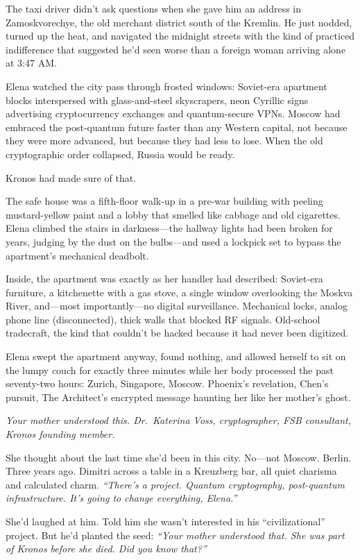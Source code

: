 \documentclass[12pt,letterpaper]{book}
\begin{document}
The taxi driver didn't ask questions when she gave him an address in Zamoskvorechye, the old merchant district south of the Kremlin. He just nodded, turned up the heat, and navigated the midnight streets with the kind of practiced indifference that suggested he'd seen worse than a foreign woman arriving alone at 3:47 AM.

Elena watched the city pass through frosted windows: Soviet-era apartment blocks interspersed with glass-and-steel skyscrapers, neon Cyrillic signs advertising cryptocurrency exchanges and quantum-secure VPNs. Moscow had embraced the post-quantum future faster than any Western capital, not because they were more advanced, but because they had less to lose. When the old cryptographic order collapsed, Russia would be ready.

Kronos had made sure of that.

The safe house was a fifth-floor walk-up in a pre-war building with peeling mustard-yellow paint and a lobby that smelled like cabbage and old cigarettes. Elena climbed the stairs in darkness---the hallway lights had been broken for years, judging by the dust on the bulbs---and used a lockpick set to bypass the apartment's mechanical deadbolt.

Inside, the apartment was exactly as her handler had described: Soviet-era furniture, a kitchenette with a gas stove, a single window overlooking the Moskva River, and---most importantly---no digital surveillance. Mechanical locks, analog phone line (disconnected), thick walls that blocked RF signals. Old-school tradecraft, the kind that couldn't be hacked because it had never been digitized.

Elena swept the apartment anyway, found nothing, and allowed herself to sit on the lumpy couch for exactly three minutes while her body processed the past seventy-two hours: Zurich, Singapore, Moscow. Phoenix's revelation, Chen's pursuit, The Architect's encrypted message haunting her like her mother's ghost.

\emph{Your mother understood this. Dr.~Katerina Voss, cryptographer, FSB consultant, Kronos founding member.}

She thought about the last time she'd been in this city. No---not Moscow. Berlin. Three years ago. Dimitri across a table in a Kreuzberg bar, all quiet charisma and calculated charm. \emph{``There's a project. Quantum cryptography, post-quantum infrastructure. It's going to change everything, Elena.''}

She'd laughed at him. Told him she wasn't interested in his ``civilizational'' project. But he'd planted the seed: \emph{``Your mother understood that. She was part of Kronos before she died. Did you know that?''}
\end{document}
